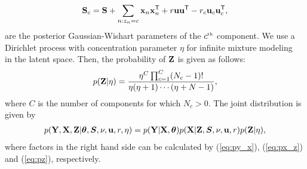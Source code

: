 %
\begin{align}
\mathbf{S}_{c}=\mathbf{S}+\sum_{n:z_{n}=c}{\bf{x}}_{n}{\bf{x}}_{n}^{\mathsf{T}} + r{\bf{u}}{\bf{u}}^{\mathsf{T}}
 - r_{c}{\bf{u}}_{c}{\bf{u}}_{c}^{\mathsf{T}},
\end{align}
%
are the posterior Gaussian-Wishart parameters of the $c^{\text{\tiny th}}$ component.
We use a Dirichlet process with concentration parameter $\eta$ for infinite mixture modeling~\citep{maceachern1998estimating} in the latent space.
Then, the probability of $\mathbf{Z}$ is given as follows:
%
\begin{align}
p(\mathbf{Z}|\eta) = 
\frac{\eta^{C}\prod_{c=1}^{C}(N_{c}-1)!}
{\eta(\eta+1)\cdots(\eta+N-1)},
\label{eq:pz}
\end{align}
%
where $C$ is the number of components for which $N_{c}>0$.
The joint distribution is given by
%
\begin{align}
p(\mathbf{Y},\mathbf{X},\mathbf{Z}|\bm{\theta},\bm{S},\nu,{\bf{u}},r,\eta)
 = p(\mathbf{Y}|\mathbf{X},\bm{\theta})
 p(\mathbf{X}|\mathbf{Z},\bm{S},\nu,{\bf{u}},r)p(\mathbf{Z}|\eta),
\label{eq:joint}
\end{align}
%
where factors in the right hand side can be calculated by (\ref{eq:py_x}), (\ref{eq:px_z}) and (\ref{eq:pz}), respectively.

